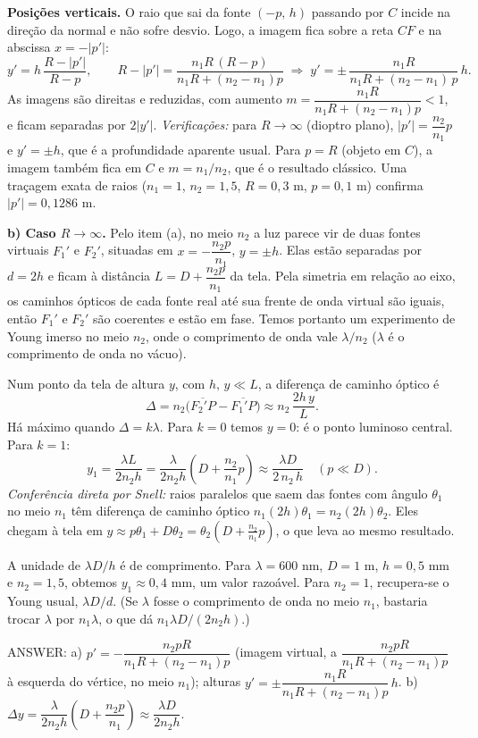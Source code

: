 \documentclass{article}%
\begin{document}
\textbf{Posições verticais.} O raio que sai da fonte $(-p,\,h)$ passando por $C$ incide na direção da normal e não sofre desvio. Logo, a imagem fica sobre a reta $C F$ e na abscissa $x=-|p'|$:
\[
y'=h\,\frac{R-|p'|}{R-p},\qquad R-|p'|=\frac{n_1R\,(R-p)}{n_1R+(n_2-n_1)p}
\;\Longrightarrow\;
y'=\pm\,\frac{n_1R}{n_1R+(n_2-n_1)\,p}\,h .
\]
As imagens são direitas e reduzidas, com aumento $m=\dfrac{n_1R}{n_1R+(n_2-n_1)p}<1$, e ficam separadas por $2|y'|$. \emph{Verificações:} para $R\to\infty$ (dioptro plano), $|p'|=\dfrac{n_2}{n_1}p$ e $y'=\pm h$, que é a profundidade aparente usual. Para $p=R$ (objeto em $C$), a imagem também fica em $C$ e $m=n_1/n_2$, que é o resultado clássico. Uma traçagem exata de raios ($n_1=1$, $n_2=1{,}5$, $R=0{,}3$ m, $p=0{,}1$ m) confirma $|p'|=0{,}1286$ m.

\textbf{b) Caso $R\to\infty$.} Pelo item (a), no meio $n_2$ a luz parece vir de duas fontes virtuais $F_1'$ e $F_2'$, situadas em $x=-\dfrac{n_2p}{n_1}$, $y=\pm h$. Elas estão separadas por $d=2h$ e ficam à distância $L=D+\dfrac{n_2p}{n_1}$ da tela. Pela simetria em relação ao eixo, os caminhos ópticos de cada fonte real até sua frente de onda virtual são iguais, então $F_1'$ e $F_2'$ são coerentes e estão em fase. Temos portanto um experimento de Young imerso no meio $n_2$, onde o comprimento de onda vale $\lambda/n_2$ ($\lambda$ é o comprimento de onda no vácuo).

Num ponto da tela de altura $y$, com $h,\,y\ll L$, a diferença de caminho óptico é
\[
\Delta = n_2\big(\overline{F_2'P}-\overline{F_1'P}\big)\approx n_2\,\frac{2h\,y}{L}.
\]
Há máximo quando $\Delta=k\lambda$. Para $k=0$ temos $y=0$: é o ponto luminoso central. Para $k=1$:
\[
y_1=\frac{\lambda L}{2n_2h}=\frac{\lambda}{2n_2h}\left(D+\frac{n_2}{n_1}p\right)\approx\frac{\lambda D}{2\,n_2\,h}\quad (p\ll D).
\]
\emph{Conferência direta por Snell:} raios paralelos que saem das fontes com ângulo $\theta_1$ no meio $n_1$ têm diferença de caminho óptico $n_1(2h)\theta_1=n_2(2h)\theta_2$. Eles chegam à tela em $y\approx p\theta_1+D\theta_2=\theta_2\left(D+\tfrac{n_2}{n_1}p\right)$, o que leva ao mesmo resultado.

A unidade de $\lambda D/h$ é de comprimento. Para $\lambda=600$ nm, $D=1$ m, $h=0{,}5$ mm e $n_2=1{,}5$, obtemos $y_1\approx0{,}4$ mm, um valor razoável. Para $n_2=1$, recupera-se o Young usual, $\lambda D/d$. (Se $\lambda$ fosse o comprimento de onda no meio $n_1$, bastaria trocar $\lambda$ por $n_1\lambda$, o que dá $n_1\lambda D/(2n_2h)$.)

\medskip
\noindent ANSWER: a) $p'=-\dfrac{n_2pR}{n_1R+(n_2-n_1)p}$ (imagem virtual, a $\dfrac{n_2pR}{n_1R+(n_2-n_1)p}$ à esquerda do vértice, no meio $n_1$); alturas $y'=\pm\dfrac{n_1R}{n_1R+(n_2-n_1)p}\,h$. b) $\Delta y=\dfrac{\lambda}{2n_2h}\left(D+\dfrac{n_2p}{n_1}\right)\approx\dfrac{\lambda D}{2n_2h}$.%
\newpage%
\end{document}
